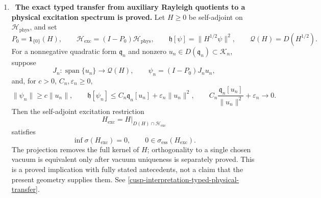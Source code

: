 \begin{enumerate}[leftmargin=1.8em,itemsep=.65em]
The finite-group isomorphism
\(H^4(U)/\ker\chi_6\cong Z(SU(6))\) supplies no \(SU(6)\) transition
functions or connection.  The injective tensor map does not factor through
\((SU(2)\times SU(3))/\mu_6\), because the central \(\mu_6\) maps to
nontrivial scalar matrices.  The distinct common-centre map is
\[
\begin{aligned}
 \Gamma_6
 &=\bigl\{((\lambda\mu)^{-1},\lambda I_2,\mu I_3):
             \lambda\in\mu_2,\ \mu\in\mu_3\bigr\},\\
 \frac{U(1)\times SU(2)\times SU(3)}{\Gamma_6}
 &\lhook\joinrel\longrightarrow U(6),\\
 [z,A,B]&\longmapsto z(A\otimes B),
\end{aligned}
\]
where \(\Gamma_6\cong\mu_6\).  Its determinant is \(z^6\), and its image
meets \(SU(6)\) in exactly \(\iota(SU(2)\times SU(3))\); the image is not
generally contained in \(SU(6)\).  The missing step is a degree-changing
identification with a degree-two common-centre lifting obstruction and its
line-operator pairing.  The separate global clutching classes on \(S^6\)
have \(c_3=\pm2ku\), \(k\in\pi_5(SU(3))\cong\mathbb Z\), and restrict
trivially to \(U\); see \cref{hrs8:subsec:su3-regular-locus}.

\item \Verified\ \textbf{The exact typed transfer from auxiliary
Rayleigh quotients to a physical excitation spectrum is proved.}
Let \(H\ge0\) be self-adjoint on \(\mathcal H_{\mathrm{phys}}\), and set
\[
 P_0=\mathbf1_{\{0\}}(H),\qquad
 \mathcal H_{\mathrm{exc}}=(I-P_0)\mathcal H_{\mathrm{phys}},\qquad
 \mathfrak h[\psi]=\lVert H^{1/2}\psi\rVert^2,\qquad
 \mathcal Q(H)=D(H^{1/2}).
\]
For a nonnegative quadratic form \(\mathfrak q_n\) and nonzero
\(u_n\in D(\mathfrak q_n)\subset\mathcal K_n\), suppose
\[
 J_n:\operatorname{span}\{u_n\}\longrightarrow\mathcal Q(H),\qquad
 \psi_n=(I-P_0)J_nu_n,
\]
and, for \(c>0\), \(C_n,\varepsilon_n\ge0\),
\[
 \lVert\psi_n\rVert\ge c\lVert u_n\rVert,\qquad
 \mathfrak h[\psi_n]\le C_n\mathfrak q_n[u_n]
 +\varepsilon_n\lVert u_n\rVert^2,\qquad
 C_n\frac{\mathfrak q_n[u_n]}{\lVert u_n\rVert^2}
 +\varepsilon_n\longrightarrow0.
\]
Then the self-adjoint excitation restriction
\[
 H_{\mathrm{exc}}
 =H\big|_{D(H)\cap\mathcal H_{\mathrm{exc}}}
\]
satisfies
\[
 \inf\sigma(H_{\mathrm{exc}})=0,\qquad
 0\in\sigma_{\mathrm{ess}}(H_{\mathrm{exc}}).
\]
The projection removes the full kernel of \(H\); orthogonality to a
single chosen vacuum is equivalent only after vacuum uniqueness is separately
proved.  This is a proved implication with fully stated antecedents, not a
claim that the present geometry supplies them.  See
\cref{cusp-interpretation-typed-physical-transfer}.


\end{enumerate}
